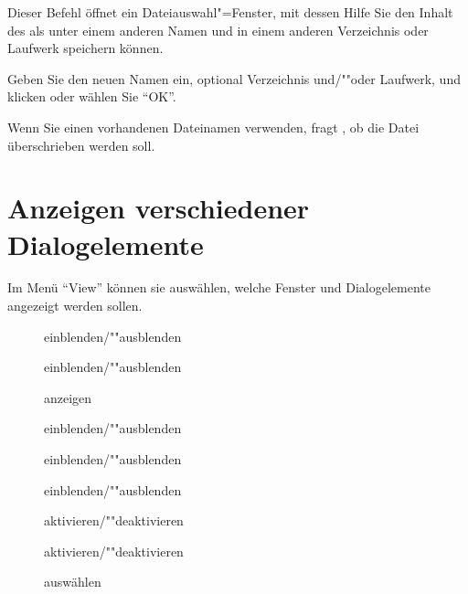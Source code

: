 Dieser Befehl öffnet ein Dateiauswahl"=Fenster, mit dessen Hilfe Sie
den Inhalt des  als
 unter einem anderen Namen
und in einem anderen Verzeichnis oder Laufwerk speichern können.


Geben Sie den neuen Namen ein, optional Verzeichnis und/""oder 
Laufwerk, und klicken oder wählen Sie "`OK"'.


Wenn Sie einen vorhandenen Dateinamen verwenden, fragt \mutabor{}, 
ob die Datei überschrieben werden soll. 


\section{Anzeigen verschiedener Dialogelemente}\label{sec:MS_VIEW}
Im Menü "`View"' können sie auswählen, welche Fenster und 
Dialogelemente angezeigt werden sollen.

\begin{description}
\item[]
   einblenden/""ausblenden
\item[]
   einblenden/""ausblenden
\item[]
   anzeigen
\item[]
   einblenden/""ausblenden
\item[]
   einblenden/""ausblenden
\item[]
   einblenden/""ausblenden
\item[]
   aktivieren/""deaktivieren
\item[]
  aktivieren/""deaktivieren
\item[]
   auswählen
\end{description}

